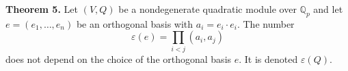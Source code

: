 \textbf{Theorem 5.} Let $(V,Q)$ be a nondegenerate quadratic module over $\mathbb{Q}_p$ and let $e = (e_1, \ldots, e_n)$ be an orthogonal basis with $a_i = e_i \cdot e_i$. The number
$$\varepsilon(e) = \prod_{i < j} (a_i, a_j)$$
does not depend on the choice of the orthogonal basis $e$. It is denoted $\varepsilon(Q)$.

